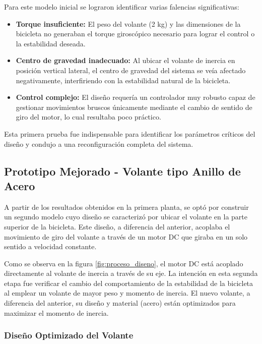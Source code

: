 \documentclass[12pt,letterpaper]{report}
\begin{document}
Para este modelo inicial se lograron identificar varias falencias significativas:

\begin{itemize}
    \item \textbf{Torque insuficiente:} El peso del volante (2 kg) y las dimensiones de la bicicleta no generaban el torque giroscópico necesario para lograr el control o la estabilidad deseada.
    \item \textbf{Centro de gravedad inadecuado:} Al ubicar el volante de inercia en posición vertical lateral, el centro de gravedad del sistema se veía afectado negativamente, interfiriendo con la estabilidad natural de la bicicleta.
    \item \textbf{Control complejo:} El diseño requería un controlador muy robusto capaz de gestionar movimientos bruscos únicamente mediante el cambio de sentido de giro del motor, lo cual resultaba poco práctico.
\end{itemize}

Esta primera prueba fue indispensable para identificar los parámetros críticos del diseño y condujo a una reconfiguración completa del sistema.

\subsection*{Prototipo Mejorado - Volante tipo Anillo de Acero}

A partir de los resultados obtenidos en la primera planta, se optó por construir un segundo modelo cuyo diseño se caracterizó por ubicar el volante en la parte superior de la bicicleta. Este diseño, a diferencia del anterior, acoplaba el movimiento de giro del volante a través de un motor DC que giraba en un solo sentido a velocidad constante.

Como se observa en la figura \ref{fig:proceso_diseno}, el motor DC está acoplado directamente al volante de inercia a través de su eje. La intención en esta segunda etapa fue verificar el cambio del comportamiento de la estabilidad de la bicicleta al emplear un volante de mayor peso y momento de inercia. El nuevo volante, a diferencia del anterior, su diseño y material (acero) están optimizados para maximizar el momento de inercia.

\subsubsection*{Diseño Optimizado del Volante}
\end{document}
